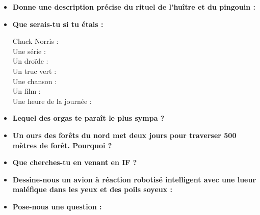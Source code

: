 \begin{itemize}
    \item \textbf{Donne une description précise du rituel  
	 de l'huître et du pingouin :}
    \vspace{3cm}

    \item \textbf{Que serais-tu si tu étais :}
    \begin{description}
	\item[Chuck Norris :]
	\vspace{1cm}
	\item[Une série :]
	\vspace{1cm}
	\item[Un droïde :]
	\vspace{1cm}
	\item[Un truc vert :]
	\vspace{1cm}
	\item[Une chanson :]
	\vspace{1cm}
	\item[Un film :]
	\vspace{1cm}
	\item[Une heure de la journée :]
	\vspace{1cm}
    \end{description}
    \item \textbf{Lequel des orgas te paraît le plus sympa ?}
    \vspace{5cm}
    \item \textbf{Un ours des forêts du nord met deux jours pour traverser 500 mètres de forêt. Pourquoi ?}
    \vspace{5cm}
    \item \textbf{Que cherches-tu en venant en IF ?}
    \vspace{5cm}
    \item \textbf{Dessine-nous un avion à réaction robotisé intelligent avec une
    lueur maléfique dans les yeux et des poils soyeux :}
    \vspace{8cm}
    \item \textbf{Pose-nous une question :}
    \vspace{5cm}
\end{itemize}
